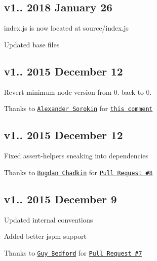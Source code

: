 \subsection*{v1.. 2018 January 26}


\begin{DoxyItemize}
\item {\ttfamily index.\+js} is now located at {\ttfamily source/index.\+js}
\item Updated base files
\end{DoxyItemize}

\subsection*{v1.. 2015 December 12}


\begin{DoxyItemize}
\item Revert minimum node version from 0. back to 0.
\begin{DoxyItemize}
\item Thanks to \href{https://github.com/syrnick}{\tt Alexander Sorokin} for \href{https://github.com/bevry/domain-browser/commit/c66ee3445e87955e70d0d60d4515f2d26a81b9c4#commitcomment-14938325}{\tt this comment}
\end{DoxyItemize}
\end{DoxyItemize}

\subsection*{v1.. 2015 December 12}


\begin{DoxyItemize}
\item Fixed {\ttfamily assert-\/helpers} sneaking into {\ttfamily dependencies}
\begin{DoxyItemize}
\item Thanks to \href{https://github.com/TrySound}{\tt Bogdan Chadkin} for \href{https://github.com/bevry/domain-browser/pull/8}{\tt Pull Request \#8}
\end{DoxyItemize}
\end{DoxyItemize}

\subsection*{v1.. 2015 December 9}


\begin{DoxyItemize}
\item Updated internal conventions
\item Added better jspm support
\begin{DoxyItemize}
\item Thanks to \href{https://github.com/guybedford}{\tt Guy Bedford} for \href{https://github.com/bevry/domain-browser/pull/7}{\tt Pull Request \#7}
\end{DoxyItemize}
\end{DoxyItemize}

